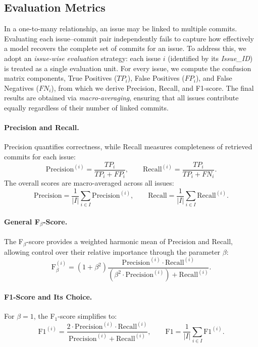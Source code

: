
\subsection{Evaluation Metrics}

In a one-to-many relationship, an issue may be linked to multiple commits. Evaluating each issue--commit pair independently fails to capture how effectively a model recovers the complete set of commits for an issue. To address this, we adopt an \emph{issue-wise evaluation} strategy: each issue $i$ (identified by its \textit{Issue\_ID}) is treated as a single evaluation unit. For every issue, we compute the confusion matrix components, True Positives ($TP_i$), False Positives ($FP_i$), and False Negatives ($FN_i$), from which we derive Precision, Recall, and F1-score. The final results are obtained via \emph{macro-averaging}, ensuring that all issues contribute equally regardless of their number of linked commits.

\paragraph{Precision and Recall.}
Precision quantifies correctness, while Recall measures completeness of retrieved commits for each issue:
\[
\text{Precision}^{(i)} = \frac{TP_i}{TP_i + FP_i}, \qquad
\text{Recall}^{(i)} = \frac{TP_i}{TP_i + FN_i}.
\]
The overall scores are macro-averaged across all issues:
\[
\text{Precision} = \frac{1}{|I|}\sum_{i \in I}\text{Precision}^{(i)}, \qquad
\text{Recall} = \frac{1}{|I|}\sum_{i \in I}\text{Recall}^{(i)}.
\]

\paragraph{General F$_\beta$-Score.}
The F$_\beta$-score provides a weighted harmonic mean of Precision and Recall, allowing control over their relative importance through the parameter $\beta$:
\[
\text{F}_{\beta}^{(i)} = (1+\beta^2)\frac{\text{Precision}^{(i)} \cdot \text{Recall}^{(i)}}{(\beta^2 \cdot \text{Precision}^{(i)}) + \text{Recall}^{(i)}}.
\]

\paragraph{F1-Score and Its Choice.}
For $\beta = 1$, the F$_1$-score simplifies to:
\[
\text{F1}^{(i)} = \frac{2 \cdot \text{Precision}^{(i)} \cdot \text{Recall}^{(i)}}{\text{Precision}^{(i)} + \text{Recall}^{(i)}}, \qquad
\text{F1} = \frac{1}{|I|}\sum_{i \in I}\text{F1}^{(i)}.
\]

